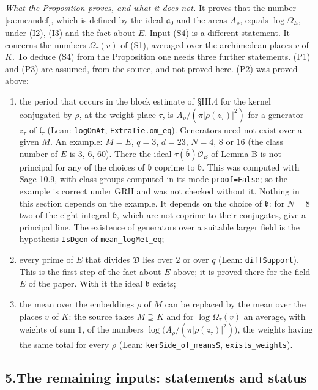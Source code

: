 \documentclass[11pt,letterpaper]{article}
\begin{document}
\emph{What the Proposition proves, and what it does not.} It proves that the number
\eqref{sa:meandef}, which is defined by the ideal $\mathfrak a_0$ and the areas $A_\rho$, equals
$\log\Omega_E$, under (I2), (I3) and the fact about $E$. Input (S4) is a different statement. It concerns
the numbers $\Omega_\tau(v)$ of (S1), averaged over the archimedean places $v$ of $K$. To deduce (S4)
from the Proposition one needs three further statements. (P1) and (P3) are assumed, from the source,
and not proved here. (P2) was proved above:
\begin{enumerate}[label=\textup{(P\arabic*)},leftmargin=2.8em,itemsep=2pt,topsep=3pt]
\item the period that occurs in the block estimate of \S III.4 for the kernel conjugated by $\rho$, at
the weight place $\tau$, is $A_\rho/(\pi|\rho(z_\tau)|^2)$ for a generator $z_\tau$ of $\mathfrak l_\tau$
(Lean: \texttt{logOmAt}, \texttt{ExtraTie.om\_eq}). Generators need not exist over a given $M$. An example: $M=E$,
$q=3$, $d=23$, $N=4$, $8$ or $16$ (the class number of $E$ is $3$, $6$, $60$). There the ideal
$\tau(\bar{\mathfrak b})\mathcal O_E$ of Lemma B is not principal for any of the choices of $\mathfrak b$
coprime to $\bar{\mathfrak b}$. This was computed with Sage 10.9, with class groups computed in its mode
\texttt{proof=False}; so the example is correct under GRH and was not checked without it. Nothing in
this section depends on the example. It depends on the choice of $\mathfrak b$: for $N=8$ two of the
eight integral $\mathfrak b$, which are not coprime to their conjugates, give a principal line. The
existence of generators over a suitable larger field is the hypothesis \texttt{IsDgen} of \texttt{mean\_logMet\_eq};
\item every prime of $E$ that divides $\mathfrak D$ lies over $2$ or over $q$ (Lean:
\texttt{diffSupport}). This is the first step of the fact about $E$ above; it is proved there for the
field $E$ of the paper. With it the ideal $\mathfrak b$ exists;
\item the mean over the embeddings $\rho$ of $M$ can be replaced by the mean over the places $v$ of $K$:
the source takes $M\supseteq K$ and for $\log\Omega_\tau(v)$ an average, with weights of sum $1$, of the
numbers $\log\big(A_\rho/(\pi|\rho(z_\tau)|^2)\big)$, the weights having the same total for every $\rho$
(Lean: \texttt{kerSide\_of\_meansS}, \texttt{exists\_weights}).
\end{enumerate}

\subsection*{5.\quad The remaining inputs: statements and status}
\end{document}
